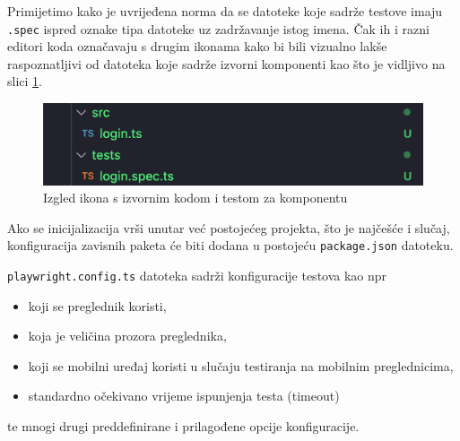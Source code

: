 Primijetimo kako je uvrijeđena norma da se datoteke koje sadrže testove imaju \texttt{.spec} ispred oznake tipa datoteke uz zadržavanje istog imena. Čak ih i razni editori koda označavaju s drugim ikonama kako bi bili vizualno lakše raspoznatljivi od datoteka koje sadrže izvorni komponenti kao što je vidljivo na slici \ref{img:filesLogos}.
\begin{figure}[!h]\begin{center}
    \includegraphics[width=1\textwidth]{"img/filesLogos"}
    \caption{Izgled ikona s izvornim kodom i testom za komponentu}\label{img:filesLogos}
\end{center}\end{figure}

Ako se inicijalizacija vrši unutar već postojećeg projekta, što je najčešće i slučaj, konfiguracija zavisnih paketa će biti dodana u postojeću \texttt{package.json} datoteku.

\texttt{playwright.config.ts} datoteka sadrži konfiguracije testova kao npr 
\begin{itemize}
    \item koji se preglednik koristi, 
    \item koja je veličina prozora preglednika, 
    \item koji se mobilni uređaj koristi u slučaju testiranja na mobilnim preglednicima,
    \item standardno očekivano vrijeme ispunjenja testa (timeout)
\end{itemize}
te mnogi drugi preddefinirane i prilagođene opcije konfiguracije.

